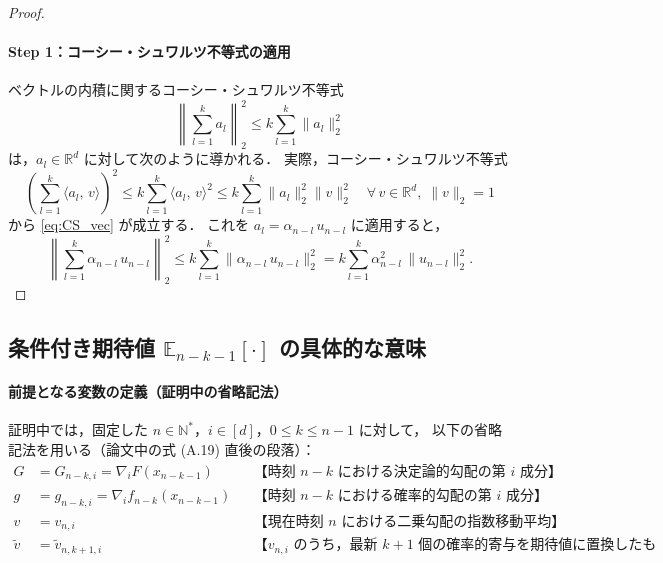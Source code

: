 \documentclass[dvipdfmx,a4paper,11pt]{jsarticle}
\begin{document}
\begin{proof}

\paragraph{Step 1：コーシー・シュワルツ不等式の適用}

ベクトルの内積に関するコーシー・シュワルツ不等式
\begin{equation}
    \left\|\sum_{l=1}^{k} a_l\right\|_2^2
    \leq k \sum_{l=1}^{k} \|a_l\|_2^2
    \label{eq:CS_vec}
\end{equation}
は，$a_l \in \mathbb{R}^d$ に対して次のように導かれる．
実際，コーシー・シュワルツ不等式
\begin{equation}
    \left(\sum_{l=1}^{k} \langle a_l,\, v \rangle\right)^2
    \leq k \sum_{l=1}^{k} \langle a_l,\, v \rangle^2
    \leq k \sum_{l=1}^{k} \|a_l\|_2^2 \|v\|_2^2
    \quad \forall\, v \in \mathbb{R}^d,\; \|v\|_2 = 1
\end{equation}
から \eqref{eq:CS_vec} が成立する．
これを $a_l = \alpha_{n-l}\, u_{n-l}$ に適用すると，
\begin{equation}
    \left\|\sum_{l=1}^{k} \alpha_{n-l}\, u_{n-l}\right\|_2^2
    \leq k \sum_{l=1}^{k} \|\alpha_{n-l}\, u_{n-l}\|_2^2
    = k \sum_{l=1}^{k} \alpha_{n-l}^2\, \|u_{n-l}\|_2^2.
    \label{eq:after_CS}
\end{equation}
\end{proof}

\subsection{条件付き期待値 $\mathbb{E}_{n-k-1}[\cdot]$ の具体的な意味}

\paragraph{前提となる変数の定義（証明中の省略記法）}

証明中では，固定した $n \in \mathbb{N}^*$，$i \in [d]$，$0 \leq k \leq n-1$ に対して，
以下の省略記法を用いる（論文中の式 (A.19) 直後の段落）：
\begin{align*}
    G &= G_{n-k,i} = \nabla_i F(x_{n-k-1})
    &&\text{【時刻 $n-k$ における決定論的勾配の第 $i$ 成分】}\\
    g &= g_{n-k,i} = \nabla_i f_{n-k}(x_{n-k-1})
    &&\text{【時刻 $n-k$ における確率的勾配の第 $i$ 成分】}\\
    v &= v_{n,i}
    &&\text{【現在時刻 $n$ における二乗勾配の指数移動平均】}\\
    \tilde{v} &= \tilde{v}_{n,k+1,i}
    &&\text{【$v_{n,i}$ のうち，最新 $k+1$ 個の確率的寄与を期待値に置換したもの】}
\end{align*}
\end{document}
